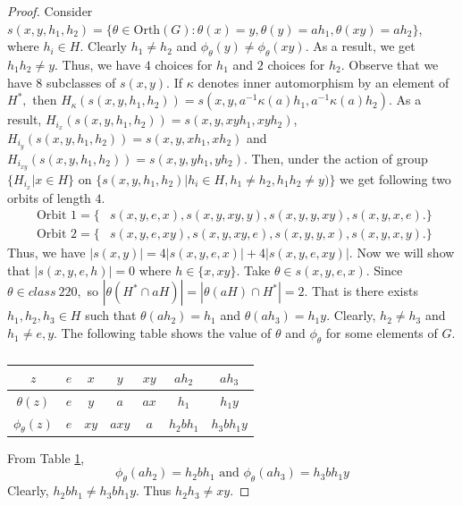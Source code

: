 \documentclass[11pt,a4paper]{article}
\theoremstyle{definition}
\theoremstyle{remark}
\begin{document}
\begin{proof}
		  Consider $s(x,y,h_{1},h_{2}) = \{\theta \in \text{Orth}(G): \theta(x) = y, \theta(y) = ah_{1}, \theta(xy) = ah_{2}\}$, where $h_{i}  \in H$. Clearly $h_{1} \neq h_{2}$ and $\phi_{\theta}(y) \neq \phi_{\theta}(xy)$. As a result, we get $h_{1}h_{2} \neq y$. Thus, we have $4$ choices for $h_{1}$ and $2$ choices for $h_{2}$. Observe that we have $8$ subclasses of $s(x,y)$. If $\kappa$ denotes inner automorphism by an element of $H^{\ast},$ then $H_{\kappa}(s(x,y,h_{1},h_{2})) = s(x,y,a^{-1}\kappa(a)h_{1},a^{-1}\kappa(a)h_{2})$. As a result, $H_{i_{x}}(s(x,y,h_{1},h_{2})) = s(x,y,xyh_{1},xyh_{2})$, $H_{i_{y}}(s(x,y,h_{1},h_{2})) = s(x,y,xh_{1},xh_{2})$ and $H_{i_{xy}}(s(x,y,h_{1},h_{2})) = s(x,y,yh_{1},yh_{2})$. Then, under the action of group $\{H_{i_{x}}| x \in H\}$ on $\{s(x,y,h_{1},h_{2})| h_{i} \in H,h_{1} \neq h_{2}, h_{1}h_{2} \neq y)\}$ we get following two orbits of length $4$.
		  	\begin{align*}
		  	\text{ Orbit 1}  =\{&s(x,y,e,x), s(x,y,xy,y), s(x,y,y,xy), s(x,y,x,e).\}\\
		  	\text{	Orbit 2}  =	\{&s(x,y,e,xy), s(x,y,xy,e), s(x,y,y,x), s(x,y,x,y).\}
		  		  \end{align*}
	   Thus, we have $\vert s(x,y) \vert = 4\vert s(x,y,e,x) \vert + 4\vert s(x,y,e,xy) \vert$. Now we will show that $|s(x,y,e,h)| = 0$ where $h \in \{x,xy\}$. Take $\theta \in s(x,y,e,x)$. Since $\theta \in class~220,$ so $|\theta(H^{\ast}\cap aH)| = |\theta(aH) \cap H^{\ast}| = 2$. That is there exists $h_{1},h_{2},h_{3} \in H$ such that $\theta(ah_{2}) = h_{1}$ and $\theta(ah_{3}) = h_{1}y.$ Clearly, $h_{2} \neq h_{3}$ and $h_{1} \neq e ,y$. The following table shows the value of $\theta$ and $\phi_{\theta}$ for some elements of  $G$.
		\begin{table}[H]
		\begin{center}
			\begin{tabular}{|c| c| c| c| c| c| c|}
			\hline
			$z$ & $e$ & $x$ & $y$ & $xy$ & $ah_{2}$& $ah_{3}$\\\hline
			$\theta(z)$& $e$ & $y$ & $a$ & $ax$ & $h_{1}$ & $h_{1}y$ \\ \hline
			$\phi_{\theta}(z)$ & $e$ & $xy$ & $axy$& $a$&$h_{2}bh_{1}$& $h_{3}bh_{1}y$\\ \hline
		\end{tabular}\caption{}\label{t1}
		\end{center}
	\end{table}
	\vspace{-.8cm}
	From Table \ref{t1}, \[ \phi_{\theta}(ah_{2}) = h_{2}bh_{1} \text{ and } \phi_{\theta}(ah_{3}) = h_{3}bh_{1}y  \tag{$\star$}
	\]
	Clearly, $h_{2}bh_{1} \neq h_{3}bh_{1}y.$ Thus $h_{2}h_{3} \neq xy.$
	

\end{proof}
\end{document}
